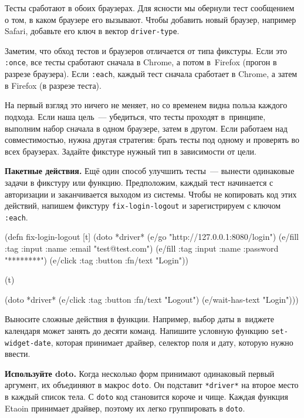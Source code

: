 \fi

Тесты сработают в обоих браузерах. Для ясности мы обернули тест сообщением о
том, в каком браузере его вызывают. Чтобы добавить новый браузер, например
Safari, добавьте его ключ в вектор \verb|driver-type|.


Заметим, что обход тестов и браузеров отличается от типа фикстуры. Если это
\verb|:once|, все тесты сработают сначала в Chrome, а потом в~Firefox (прогон в
разрезе браузера). Если \verb|:each|, каждый тест сначала сработает в Chrome, а
затем в Firefox (в разрезе теста).

На первый взгляд это ничего не меняет, но со временем видна польза каждого
подхода. Если наша цель~--- убедиться, что тесты проходят в~принципе, выполним
набор сначала в одном браузере, затем в другом. Если работаем над
совместимостью, нужна другая стратегия: брать тесты под одному и проверять во
всех браузерах. Задайте фикстуре нужный тип в зависимости от цели.

\textbf{Пакетные действия.} Ещё один способ улучшить тесты~--- вынести
одинаковые задачи в фикстуру или функцию. Предположим, каждый тест начинается с
авторизации и заканчивается выходом из системы. Чтобы не копировать код этих
действий, напишем фикстуру \verb|fix-login-logout| и зарегистрируем с ключом
\verb|:each|.

\begin{english}
  \begin{clojure}
(defn fix-login-logout [t]
  (doto *driver*
    (e/go "http://127.0.0.1:8080/login")
    (e/fill {:tag :input :name :email}
            "test@test.com")
    (e/fill {:tag :input :name :password}
            "********")
    (e/click {:tag :button
              :fn/text "Login"}))

  (t)

  (doto *driver*
    (e/click {:tag :button
              :fn/text "Logout"})
    (e/wait-has-text "Login")))
  \end{clojure}
\end{english}

Выносите сложные действия в функции. Например, выбор даты в~виджете календаря
может занять до десяти команд. Напишите условную функцию \verb|set-widget-date|,
которая принимает драйвер, селектор поля и дату, которую нужно ввести.


\textbf{Используйте doto.} Когда несколько форм принимают одинаковый первый
аргумент, их объединяют в макрос \verb|doto|. Он подставит \verb|*driver*| на
второе место в каждый список тела. С \verb|doto| код становится короче и
чище. Каждая функция Etaoin принимает драйвер, поэтому их легко группировать в
\verb|doto|.

